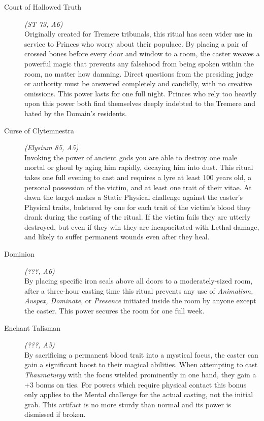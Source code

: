 \begin{description}
	\item[Court of Hallowed Truth] \emph{(ST 73, A6)} \hfill \\
	Originally created for Tremere tribunals, this ritual has seen wider use in service to Princes who worry about their populace.  
	By placing a pair of crossed bones before every door and window to a room, the caster weaves a powerful magic that prevents 
	any falsehood from being spoken within the room, no matter how damning.  Direct questions from the presiding judge or 
	authority must be answered completely and candidly, with no creative omissions.  This power lasts for one full night.  Princes 
	who rely too heavily upon this power both find themselves deeply indebted to the Tremere and hated by the Domain's residents. \\

	\item[Curse of Clytemnestra] \emph{(Elysium 85, A5)} \hfill \\
	Invoking the power of ancient gods you are able to destroy one male mortal or ghoul by aging him rapidly, decaying him into dust.  
	This ritual takes one full evening to cast and requires a lyre at least 100 years old, a personal possession of the victim, and 
	at least one trait of their vitae.  At dawn the target makes a Static Physical challenge against the caster's Physical traits, 
	bolstered by one for each trait of the victim's blood they drank during the casting of the ritual.  If the victim fails they are 
	utterly destroyed, but even if they win they are incapacitated with Lethal damage, and likely to suffer permanent wounds even after 
	they heal. \\

	\item[Dominion] \emph{(???, A6)} \hfill \\
	By placing specific iron seals above all doors to a moderately-sized room, after a three-hour casting time this ritual prevents any 
	use of \emph{Animalism, Auspex, Dominate}, or \emph{Presence} initiated inside the room by anyone except the caster.  This power 
	secures the room for one full week. \\

	\item[Enchant Talisman] \emph{(???, A5)} \hfill \\
	By sacrificing a permanent blood trait into a mystical focus, the caster can gain a significant boost to their magical abilities.  
	When attempting to cast \emph{Thaumaturgy} with the focus wielded prominently in one hand, they gain a +3 bonus on ties.  For powers 
	which require physical contact this bonus only applies to the Mental challenge for the actual casting, not the initial grab.  This 
	artifact is no more sturdy than normal and its power is dismissed if broken. \\
	

\end{description}
